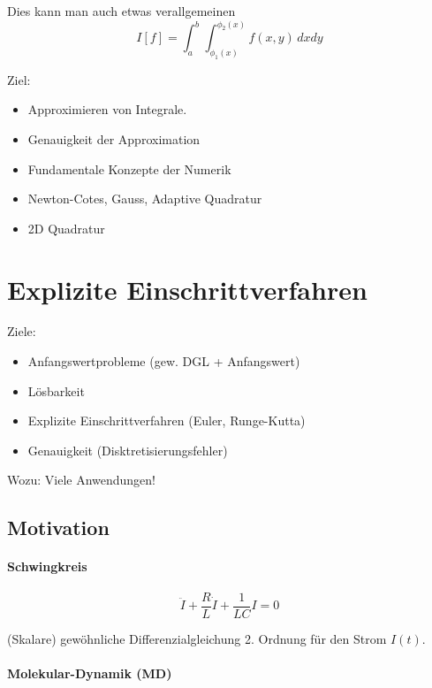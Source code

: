 \documentclass[a4paper]{article}
\begin{document}
\skelfig

Dies kann man auch etwas verallgemeinen
\[
  I[f] = \int_a^b \int_{\phi_1(x)}^{\phi_2(x)} f(x,y) \, dxdy
\]

Ziel:
\begin{itemize}
  \item Approximieren von Integrale.
  \item Genauigkeit der Approximation
  \item Fundamentale Konzepte der Numerik
  \item Newton-Cotes, Gauss, Adaptive Quadratur
  \item 2D Quadratur
\end{itemize}

\section{Explizite Einschrittverfahren}

Ziele:
\begin{itemize}
  \item Anfangswertprobleme (gew. DGL + Anfangswert)
  \item Lösbarkeit
  \item Explizite Einschrittverfahren (Euler, Runge-Kutta)
  \item Genauigkeit (Disktretisierungsfehler)
\end{itemize}

Wozu: Viele Anwendungen!

\subsection{Motivation}

\paragraph{Schwingkreis}

\[
  \ddot{I} + \frac{R}{L} \dot{I} + \frac{1}{LC} I = 0
\]

(Skalare) gewöhnliche Differenzialgleichung 2. Ordnung für den Strom $I(t)$.

\begin{center}
\end{center}

\paragraph{Molekular-Dynamik (MD)}
\end{document}
